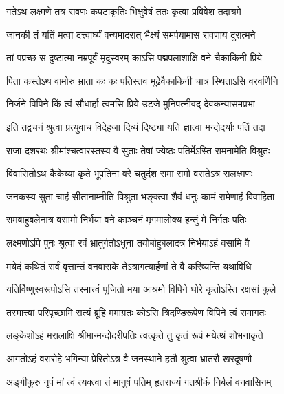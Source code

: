 \twolineshloka
{गतेऽथ लक्ष्मणे तत्र रावणः कपटाकृतिः}
{भिक्षुवेषं ततः कृत्वा प्रविवेश तदाश्रमे}%

\twolineshloka
{जानकी तं यतिं मत्वा दत्त्वार्घ्यं वन्यमादरात्}
{भैक्ष्यं समर्पयामास रावणाय दुरात्मने}%

\twolineshloka
{तां पप्रच्छ स दुष्टात्मा नम्रपूर्वं मृदुस्वरम्}
{काऽसि पद्मपलाशाक्षि वने चैकाकिनी प्रिये}%

\twolineshloka
{पिता कस्तेऽथ वामोरु भ्राता कः कः पतिस्तव}
{मूढेवैकाकिनी चात्र स्थिताऽसि वरवर्णिनि}%

\twolineshloka
{निर्जने विपिने किं त्वं सौधार्हा त्वमसि प्रिये}
{उटजे मुनिपत्‍नीवद् देवकन्यासमप्रभा}%



\twolineshloka
{इति तद्वचनं श्रुत्वा प्रत्युवाच विदेहजा}
{दिव्यं दिष्ट्या यतिं ज्ञात्वा मन्दोदर्याः पतिं तदा}%

\twolineshloka
{राजा दशरथः श्रीमांश्चत्वारस्तस्य वै सुताः}
{तेषां ज्येष्ठः पतिर्मेऽस्ति रामनामेति विश्रुतः}%

\twolineshloka
{विवासितोऽथ कैकेय्या कृते भूपतिना वरे}
{चतुर्दश समा रामो वसतेऽत्र सलक्ष्मणः}%

\twolineshloka
{जनकस्य सुता चाहं सीतानाम्नीति विश्रुता}
{भङ्क्त्वा शैवं धनुः कामं रामेणाहं विवाहिता}%

\twolineshloka
{रामबाहुबलेनात्र वसामो निर्भया वने}
{काञ्चनं मृगमालोक्य हन्तुं मे निर्गतः पतिः}%

\twolineshloka
{लक्ष्मणोऽपि पुनः श्रुत्वा रवं भ्रातुर्गतोऽधुना}
{तयोर्बाहुबलादत्र निर्भयाऽहं वसामि वै}%

\twolineshloka
{मयेदं कथितं सर्वं वृत्तान्तं वनवासके}
{तेऽत्रागत्यार्हणां ते वै करिष्यन्ति यथाविधि}%

\twolineshloka
{यतिर्विष्णुस्वरूपोऽसि तस्मात्त्वं पूजितो मया}
{आश्रमो विपिने घोरे कृतोऽस्ति रक्षसां कुले}%

\twolineshloka
{तस्मात्त्वां परिपृच्छामि सत्यं ब्रूहि ममाग्रतः}
{कोऽसि त्रिदण्डिरूपेण विपिने त्वं समागतः}%




\twolineshloka
{लङ्केशोऽहं मरालाक्षि श्रीमान्मन्दोदरीपतिः}
{त्वत्कृते तु कृतं रूपं मयेत्थं शोभनाकृते}%

\twolineshloka
{आगतोऽहं वरारोहे भगिन्या प्रेरितोऽत्र वै}
{जनस्थाने हतौ श्रुत्वा भ्रातरौ खरदूषणौ}%

\twolineshloka
{अङ्गीकुरु नृपं मां त्वं त्यक्त्वा तं मानुषं पतिम्}
{हृतराज्यं गतश्रीकं निर्बलं वनवासिनम्}%

